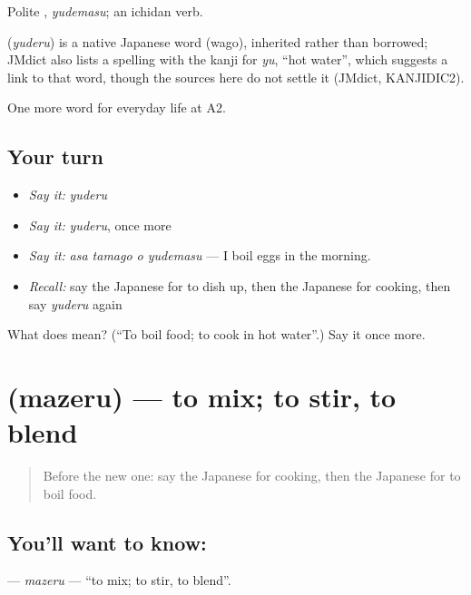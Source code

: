 Polite \textbf{}, \emph{yudemasu}; an ichidan verb.

\begin{cousinweb}
\textbf{} (\emph{yuderu}) is a native Japanese word (wago), inherited rather than borrowed; JMdict also lists a spelling with the kanji for \emph{yu}, \textquotedblleft{}hot water\textquotedblright{}, which suggests a link to that word, though the sources here do not settle it (JMdict, KANJIDIC2).
\end{cousinweb}

\begin{grammarlens}[title={What you've built}]
One more word for everyday life at A2.
\end{grammarlens}

\subsection*{Your turn}
\begin{itemize}
\raggedright
  \item \emph{Say it:} \emph{yuderu}
  \item \emph{Say it:} \emph{yuderu}, once more
  \item \emph{Say it:} \emph{asa tamago o yudemasu} — I boil eggs in the morning.
  \item \emph{Recall:} say the Japanese for to dish up, then the Japanese for cooking, then say \emph{yuderu} again
\end{itemize}

\begin{tcolorbox}[breakable,colback=teal!4,colframe=teal!35!black,title={Before you move on}]
What does  mean? (\textquotedblleft{}To boil food; to cook in hot water\textquotedblright{}.) Say it once more.
\end{tcolorbox}
\section[\texorpdfstring{\ja{まぜる} (mazeru)}{まぜる (mazeru)}]{ (mazeru) — to mix; to stir, to blend}

\label{lesson:JA-C175-mazeru}



\begin{quote}
Before the new one: say the Japanese for cooking, then the Japanese for to boil food.
\end{quote}

\subsection*{You'll want to know: }
\textbf{} — \emph{mazeru} — \textquotedblleft{}to mix; to stir, to blend\textquotedblright{}.

